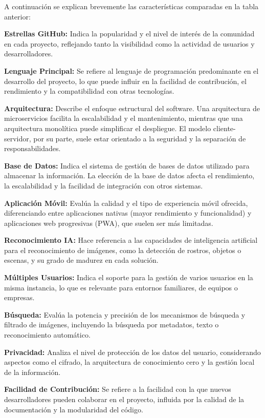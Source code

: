 A continuación se explican brevemente las características comparadas en la tabla anterior:

\textbf{Estrellas GitHub:} Indica la popularidad y el nivel de interés de la comunidad en cada proyecto, reflejando tanto la visibilidad como la actividad de usuarios y desarrolladores.

\textbf{Lenguaje Principal:} Se refiere al lenguaje de programación predominante en el desarrollo del proyecto, lo que puede influir en la facilidad de contribución, el rendimiento y la compatibilidad con otras tecnologías.

\textbf{Arquitectura:} Describe el enfoque estructural del software. Una arquitectura de microservicios facilita la escalabilidad y el mantenimiento, mientras que una arquitectura monolítica puede simplificar el despliegue. El modelo cliente-servidor, por su parte, suele estar orientado a la seguridad y la separación de responsabilidades.

\textbf{Base de Datos:} Indica el sistema de gestión de bases de datos utilizado para almacenar la información. La elección de la base de datos afecta el rendimiento, la escalabilidad y la facilidad de integración con otros sistemas.

\textbf{Aplicación Móvil:} Evalúa la calidad y el tipo de experiencia móvil ofrecida, diferenciando entre aplicaciones nativas (mayor rendimiento y funcionalidad) y aplicaciones web progresivas (PWA), que suelen ser más limitadas.

\textbf{Reconocimiento IA:} Hace referencia a las capacidades de inteligencia artificial para el reconocimiento de imágenes, como la detección de rostros, objetos o escenas, y su grado de madurez en cada solución.

\textbf{Múltiples Usuarios:} Indica el soporte para la gestión de varios usuarios en la misma instancia, lo que es relevante para entornos familiares, de equipos o empresas.

\textbf{Búsqueda:} Evalúa la potencia y precisión de los mecanismos de búsqueda y filtrado de imágenes, incluyendo la búsqueda por metadatos, texto o reconocimiento automático.

\textbf{Privacidad:} Analiza el nivel de protección de los datos del usuario, considerando aspectos como el cifrado, la arquitectura de conocimiento cero y la gestión local de la información.

\textbf{Facilidad de Contribución:} Se refiere a la facilidad con la que nuevos desarrolladores pueden colaborar en el proyecto, influida por la calidad de la documentación y la modularidad del código.

